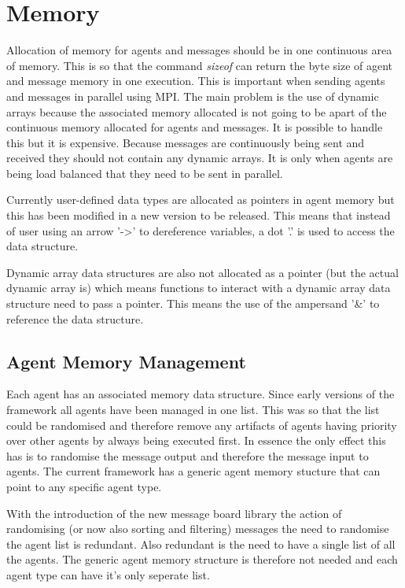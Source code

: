 \section{Memory}

Allocation of memory for agents and messages should be in one continuous area of
memory. This is so that the command \textit{sizeof} can return the byte size of
agent and message memory in one execution. This is important when sending agents
and messages in parallel using MPI. The main problem is the use of dynamic arrays
because the associated memory allocated is not going to be apart of the
continuous memory allocated for agents and messages. It is possible to handle this but it is
expensive. Because messages are continuously being sent and received they should
not contain any dynamic arrays. It is only when agents are being load balanced
that they need to be sent in parallel.

Currently user-defined data types are allocated as pointers in agent memory but
this has been modified in a new version to be released. This means that instead
of user using an arrow '-\textgreater' to dereference variables, a dot '.' is
used to access the data structure.

Dynamic array data structures are also not allocated as a pointer (but the actual
dynamic array is) which means functions to interact with a dynamic array data
structure need to pass a pointer. This means the use of the ampersand '\&' to
reference the data structure.

\subsection{Agent Memory Management}

Each agent has an associated memory data structure. Since early versions of the
framework all agents have been managed in one list. This was so that the list
could be randomised and therefore remove any artifacts of agents having priority
over other agents by always being executed first. In essence the only effect this
has is to randomise the message output and therefore the message input to agents.
The current framework has a generic agent memory stucture that can point to any
specific agent type.

With the introduction of the new message board library the action of randomising
(or now also sorting and filtering) messages the need to randomise the agent list
is redundant. Also redundant is the need to have a single list of all the agents.
The generic agent memory structure is therefore not needed and each agent type
can have it's only seperate list.
